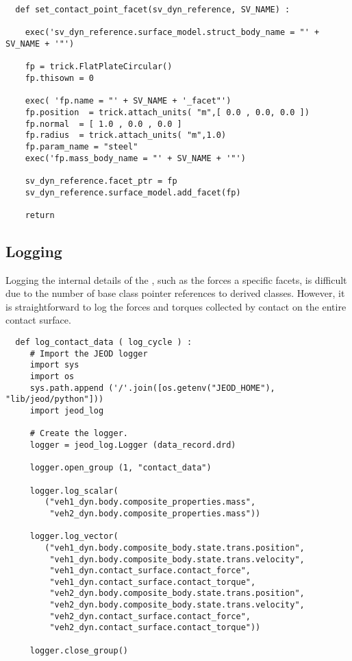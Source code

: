\begin{verbatim}
  def set_contact_point_facet(sv_dyn_reference, SV_NAME) :

    exec('sv_dyn_reference.surface_model.struct_body_name = "' + SV_NAME + '"')

    fp = trick.FlatPlateCircular()
    fp.thisown = 0

    exec( 'fp.name = "' + SV_NAME + '_facet"')
    fp.position  = trick.attach_units( "m",[ 0.0 , 0.0, 0.0 ])
    fp.normal  = [ 1.0 , 0.0 , 0.0 ]
    fp.radius  = trick.attach_units( "m",1.0)
    fp.param_name = "steel"
    exec('fp.mass_body_name = "' + SV_NAME + '"')

    sv_dyn_reference.facet_ptr = fp
    sv_dyn_reference.surface_model.add_facet(fp)

    return
\end{verbatim}

\subsection{Logging}
Logging the internal details of the \ModelDesc, such as the forces a specific facets, is difficult due to the number of base class pointer references to derived classes.  However, it is straightforward to log the forces and torques collected by contact on the entire contact surface.
\begin{verbatim}
  def log_contact_data ( log_cycle ) :
     # Import the JEOD logger
     import sys
     import os
     sys.path.append ('/'.join([os.getenv("JEOD_HOME"), "lib/jeod/python"]))
     import jeod_log

     # Create the logger.
     logger = jeod_log.Logger (data_record.drd)

     logger.open_group (1, "contact_data")

     logger.log_scalar(
        ("veh1_dyn.body.composite_properties.mass",
         "veh2_dyn.body.composite_properties.mass"))

     logger.log_vector(
        ("veh1_dyn.body.composite_body.state.trans.position",
         "veh1_dyn.body.composite_body.state.trans.velocity",
         "veh1_dyn.contact_surface.contact_force",
         "veh1_dyn.contact_surface.contact_torque",
         "veh2_dyn.body.composite_body.state.trans.position",
         "veh2_dyn.body.composite_body.state.trans.velocity",
         "veh2_dyn.contact_surface.contact_force",
         "veh2_dyn.contact_surface.contact_torque"))

     logger.close_group()
\end{verbatim}


